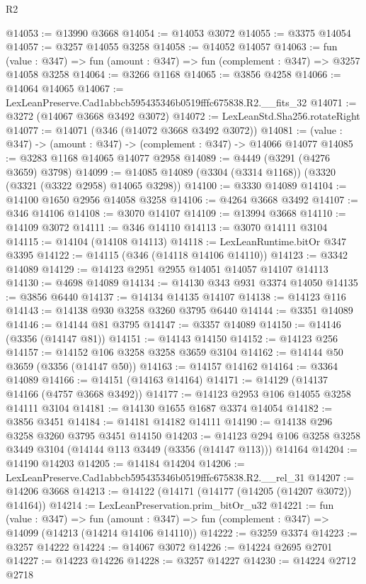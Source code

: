 \begin{lexlean}{R2}
\begin{coremodule}
@14053 := @13990 @3668
@14054 := @14053 @3072
@14055 := @3375 @14054
@14057 := @3257 @14055 @3258
@14058 := @14052 @14057
@14063 := fun (value : @347) => fun (amount : @347) => fun (complement : @347) => @3257 @14058 @3258
@14064 := @3266 @1168
@14065 := @3856 @4258
@14066 := @14064 @14065
@14067 := LexLeanPreserve.Cad1abbcb595435346b0519fffc675838.R2.__fits_32
@14071 := @3272 (@14067 @3668 @3492 @3072)
@14072 := LexLeanStd.Sha256.rotateRight
@14077 := @14071 (@346 (@14072 @3668 @3492 @3072))
@14081 := (value : @347) -> (amount : @347) -> (complement : @347) -> @14066 @14077
@14085 := @3283 @1168 @14065 @14077 @2958
@14089 := @4449 (@3291 (@4276 @3659) @3798)
@14099 := @14085 @14089 (@3304 (@3314 @1168)) (@3320 (@3321 (@3322 @2958) @14065 @3298))
@14100 := @3330 @14089
@14104 := @14100 @1650 @2956 @14058 @3258
@14106 := @4264 @3668 @3492
@14107 := @346 @14106
@14108 := @3070 @14107
@14109 := @13994 @3668
@14110 := @14109 @3072
@14111 := @346 @14110
@14113 := @3070 @14111 @3104
@14115 := @14104 (@14108 @14113)
@14118 := LexLeanRuntime.bitOr @347 @3395
@14122 := @14115 (@346 (@14118 @14106 @14110))
@14123 := @3342 @14089
@14129 := @14123 @2951 @2955 @14051 @14057 @14107 @14113
@14130 := @4698 @14089
@14134 := @14130 @343 @931 @3374 @14050
@14135 := @3856 @6440
@14137 := @14134 @14135 @14107
@14138 := @14123 @116
@14143 := @14138 @930 @3258 @3260 @3795 @6440
@14144 := @3351 @14089
@14146 := @14144 @81 @3795
@14147 := @3357 @14089
@14150 := @14146 (@3356 (@14147 @81))
@14151 := @14143 @14150
@14152 := @14123 @256
@14157 := @14152 @106 @3258 @3258 @3659 @3104
@14162 := @14144 @50 @3659 (@3356 (@14147 @50))
@14163 := @14157 @14162
@14164 := @3364 @14089
@14166 := @14151 (@14163 @14164)
@14171 := @14129 (@14137 @14166 (@4757 @3668 @3492))
@14177 := @14123 @2953 @106 @14055 @3258 @14111 @3104
@14181 := @14130 @1655 @1687 @3374 @14054
@14182 := @3856 @3451
@14184 := @14181 @14182 @14111
@14190 := @14138 @296 @3258 @3260 @3795 @3451 @14150
@14203 := @14123 @294 @106 @3258 @3258 @3449 @3104 (@14144 @113 @3449 (@3356 (@14147 @113))) @14164
@14204 := @14190 @14203
@14205 := @14184 @14204
@14206 := LexLeanPreserve.Cad1abbcb595435346b0519fffc675838.R2.__rel_31
@14207 := @14206 @3668
@14213 := @14122 (@14171 (@14177 (@14205 (@14207 @3072)) @14164))
@14214 := LexLeanPreservation.prim_bitOr_u32
@14221 := fun (value : @347) =>
  fun (amount : @347) => fun (complement : @347) => @14099 (@14213 (@14214 @14106 @14110))
@14222 := @3259 @3374
@14223 := @3257 @14222
@14224 := @14067 @3072
@14226 := @14224 @2695 @2701
@14227 := @14223 @14226
@14228 := @3257 @14227
@14230 := @14224 @2712 @2718

\end{coremodule}
\end{lexlean}
